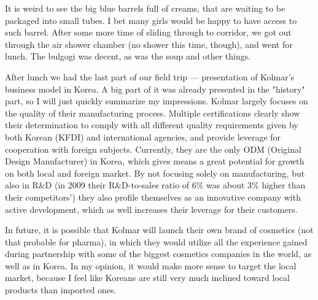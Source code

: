 \begin{post}
\begin{content}


It is weird to see the big blue barrels full of creams, that are waiting to be packaged into small tubes. I bet many girls would be happy to have access to such barrel. After some more time of sliding through to corridor, we got out through the air shower chamber (no shower this time, though), and went for lunch. The bulgogi was decent, as was the soup and other things.


After lunch we had the last part of our field trip — presentation of Kolmar's business model in Korea. A big part of it was already presented in the "history" part, so I will just quickly summarize my impressions. Kolmar largely focuses on the quality of their manufacturing process. Multiple certifications clearly show their determination to comply with all different quality requirements given by both Korean (KFDI) and international agencies, and provide leverage for cooperation with foreign subjects. Currently, they are the only ODM (Original Design Manufacturer) in Korea, which gives means a great potential for growth on both local and foreign market. By not focusing solely on manufacturing, but also in R\&D (in 2009 their R\&D-to-sales ratio of 6\% was about 3\% higher than their competitors') they also profile themselves as an innovative company with active development, which as well increases their leverage for their customers.

In future, it is possible that Kolmar will launch their own brand of cosmetics (not that probable for pharma), in which they would utilize all the experience gained during partnership with some of the biggest cosmetics companies in the world, as well as in Korea. In my opinion, it would make more sense to target the local market, because I feel like Koreans are still very much inclined toward local products than imported ones.


\end{content}
\end{post}
